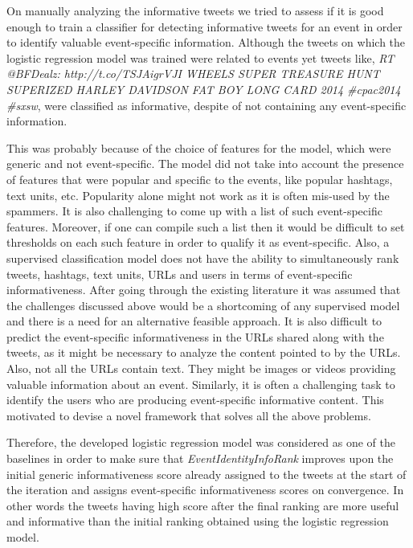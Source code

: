 \begin{enumerate}
On manually analyzing the informative tweets we tried to assess if it is good enough to train a classifier for detecting informative tweets for an event in order to identify valuable event-specific information. Although the tweets on which the logistic regression model was trained were related to events yet tweets like, \textit{RT @BFDealz: http://t.co/TSJAigrVJI WHEELS SUPER TREASURE HUNT SUPERIZED HARLEY DAVIDSON FAT BOY LONG CARD 2014 \#cpac2014 \#sxsw}, were classified as informative, despite of not containing any event-specific information. 

This was probably because of the choice of features for the model, which were generic and not event-specific. The model did not take into account the presence of features that were popular and specific to the events, like popular hashtags, text units, etc. Popularity alone might not work as it is often mis-used by the spammers. It is also challenging to come up with a list of such event-specific features. Moreover, if one can compile such a list then it would be difficult to set thresholds on each such feature in order to qualify it as event-specific. Also, a supervised classification model does not have the ability to simultaneously rank tweets, hashtags, text units, URLs and users in terms of event-specific informativeness. After going through the existing literature it was assumed that the challenges discussed above would be a shortcoming of any supervised model and there is a need for an alternative feasible approach. It is also difficult to predict the event-specific informativeness in the URLs shared along with the tweets, as it might be necessary to analyze the content pointed to by the URLs. Also, not all the URLs contain text. They might be images or videos providing valuable information about an event. Similarly, it is often a challenging task to identify the users who are producing event-specific informative content. This motivated to devise a novel framework that solves all the above problems.


Therefore, the developed logistic regression model was considered as one of the baselines in order to make sure that \textit{EventIdentityInfoRank} improves upon the initial generic informativeness score already assigned to the tweets at the start of the iteration and assigns event-specific informativeness scores on convergence. In other words the tweets having high score after the final ranking are more useful and informative than the initial ranking obtained using the logistic regression model.

\end{enumerate}


